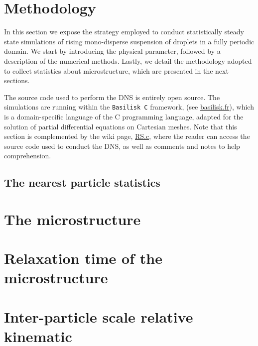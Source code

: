 \documentclass{My_preprint}
\begin{document}


\section{Methodology}
\label{sec:methodo}
In this section we expose the strategy employed to conduct statistically steady state simulations of rising mono-disperse suspension of droplets in a fully periodic domain. 
We start by introducing the physical parameter, followed by a description of the numerical methods.
Lastly, we detail the methodology adopted to collect statistics about microstructure, which are presented in the next sections.

The source code used to perform the DNS is entirely open source.
The simulations are running within the \texttt{Basilisk C} framework, (see \href{http://basilisk.fr}{basilisk.fr}), which is a domain-specific language of the C programming language, adapted for the solution of partial differential equations on Cartesian meshes. 
Note that this section is complemented by the wiki page, \href{http://basilisk.fr/sandbox/fintzin/Rising-Suspenion/RS.c}{RS.c}, where the reader can access the source code used to conduct the DNS, as well as comments and notes to help comprehension. 








\subsection{The nearest particle statistics}




\section{The microstructure}
\label{sec:microstructure}



\section{Relaxation time of the microstructure}
\label{sec:time}



\section{Inter-particle scale relative kinematic}
\label{sec:velocity}

\end{document}
